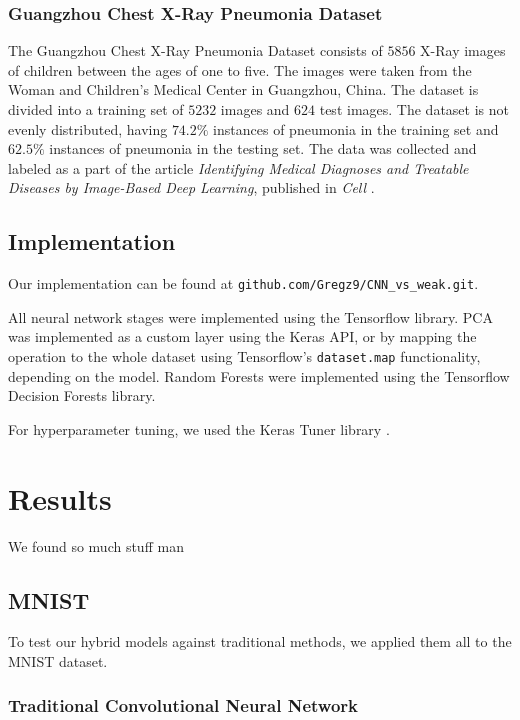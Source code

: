 \documentclass[onecolumn,10pt,cleanfoot]{asme2ej}
\begin{document}
\subsubsection{Guangzhou Chest X-Ray Pneumonia Dataset}

The Guangzhou Chest X-Ray Pneumonia Dataset consists of $5856$ X-Ray images of children between the ages of one to five. The images were taken from the Woman and Children's Medical Center in Guangzhou, China. The dataset is divided into a training set of $5232$ images and $624$ test images. The dataset is not evenly distributed, having $74.2\%$ instances of pneumonia in the training set and $62.5\%$ instances of pneumonia in the testing set. The data was collected and labeled as a part of the article {\it Identifying Medical Diagnoses and Treatable Diseases by Image-Based Deep Learning}, published in {\it Cell} \cite{xray}.

\subsection{Implementation}

Our implementation can be found at \texttt{github.com/Gregz9/CNN\_vs\_weak.git}.

All neural network stages were implemented using the Tensorflow library. PCA was implemented as a custom layer using the Keras API, or by mapping the operation to the whole dataset using Tensorflow's \texttt{dataset.map} functionality, depending on the model. Random Forests were implemented using the Tensorflow Decision Forests library.

For hyperparameter tuning, we used the Keras Tuner library \cite{kerastuner}.

\section{Results}

We found so much stuff man

\subsection{MNIST}

To test our hybrid models against traditional methods, we applied them all to the MNIST dataset.

\subsubsection{Traditional Convolutional Neural Network}
\end{document}
